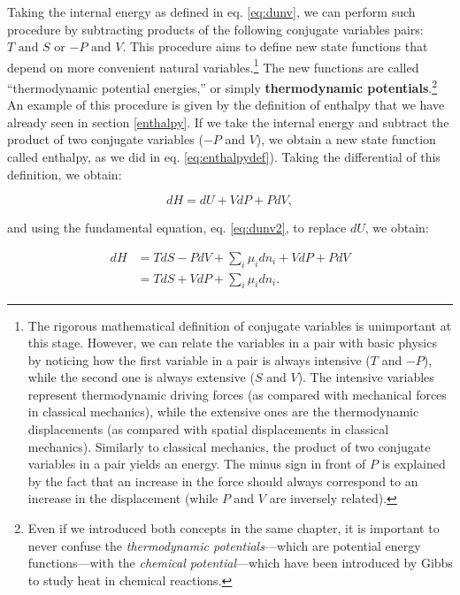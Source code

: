 \documentclass[
  9pt,
]{extbook}
\theoremstyle{definition}
\theoremstyle{definition}
\theoremstyle{definition}
\theoremstyle{definition}
\theoremstyle{remark}
\begin{document}
Taking the internal energy as defined in eq. \eqref{eq:dunv}, we can perform such procedure by subtracting products of the following conjugate variables pairs: \(T \text{ and } S\) or \(-P \text{ and } V\). This procedure aims to define new state functions that depend on more convenient natural variables.\footnote{The rigorous mathematical definition of conjugate variables is unimportant at this stage. However, we can relate the variables in a pair with basic physics by noticing how the first variable in a pair is always intensive (\(T\) and \(-P\)), while the second one is always extensive (\(S\) and \(V\)). The intensive variables represent thermodynamic driving forces (as compared with mechanical forces in classical mechanics), while the extensive ones are the thermodynamic displacements (as compared with spatial displacements in classical mechanics). Similarly to classical mechanics, the product of two conjugate variables in a pair yields an energy. The minus sign in front of \(P\) is explained by the fact that an increase in the force should always correspond to an increase in the displacement (while \(P\) and \(V\) are inversely related).} The new functions are called ``thermodynamic potential energies,'' or simply \textbf{thermodynamic potentials}.\footnote{Even if we introduced both concepts in the same chapter, it is important to never confuse the \emph{thermodynamic potentials}---which are potential energy functions---with the \emph{chemical potential}---which have been introduced by Gibbs to study heat in chemical reactions.} An example of this procedure is given by the definition of enthalpy that we have already seen in section \ref{enthalpy}. If we take the internal energy and subtract the product of two conjugate variables (\(-P\) and \(V\)), we obtain a new state function called enthalpy, as we did in eq. \eqref{eq:enthalpydef}). Taking the differential of this definition, we obtain:

\begin{equation}
dH = dU +VdP +PdV,
\label{eq:dhdef1}
\end{equation}

and using the fundamental equation, eq. \eqref{eq:dunv2}, to replace \(dU\), we obtain:

\begin{equation}
\begin{aligned}
dH & = TdS -PdV +\sum_i\mu_i dn_i +VdP +PdV  \\
   & = TdS +VdP +\sum_i\mu_i dn_i.
\end{aligned}
\label{eq:dhdef2}
\end{equation}
\end{document}
